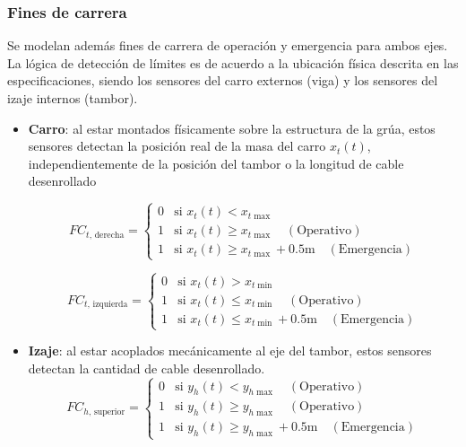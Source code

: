 \documentclass{article}
\begin{document}
\subsubsection{Fines de carrera}
Se modelan además fines de carrera de operación y emergencia para ambos ejes.
La lógica de detección de límites es de acuerdo a la ubicación física descrita en 
las especificaciones, siendo los sensores del carro externos (viga) y los sensores 
del izaje internos (tambor). 
\begin{itemize} 
\item \textbf{Carro}: al estar montados físicamente sobre la estructura de la
grúa, estos sensores detectan la posición real de la masa del carro $x_t(t)$, 
independientemente de la posición del tambor o la longitud de cable desenrollado

\begin{equation}
    FC_{t,\,\text{derecha}} = 
    \begin{cases} 
        0 & \text{si } x_t(t) < x_{t\max}  \\
        1 & \text{si } x_t(t) \ge x_{t\max} \quad (\text{Operativo}) \\
        1 & \text{si } x_t(t) \ge x_{t\max} + 0.5 \text{m} \quad (\text{Emergencia})
    \end{cases}
\end{equation}

\begin{equation}
    FC_{t,\,\text{izquierda}} = 
    \begin{cases} 
        0 & \text{si } x_t(t) > x_{t\min}  \\
        1 & \text{si } x_t(t) \le x_{t\min} \quad (\text{Operativo}) \\
        1 & \text{si } x_t(t) \le x_{t\min} + 0.5 \text{m} \quad (\text{Emergencia})
    \end{cases}
\end{equation}
\item \textbf{Izaje}: al estar acoplados mecánicamente al eje del tambor, estos 
sensores detectan la cantidad de cable desenrollado. 
\begin{equation}
    FC_{h,\,\text{superior}} = 
    \begin{cases}
        0 & \text{si } y_h(t) < y_{h\max} \quad (\text{Operativo}) \\
        1 & \text{si } y_h(t) \ge y_{h\max} \quad (\text{Operativo}) \\
        1 & \text{si } y_h(t) \ge y_{h\max} + 0.5 \text{m} \quad (\text{Emergencia})
    \end{cases}
\end{equation}


\end{itemize}
\end{document}
